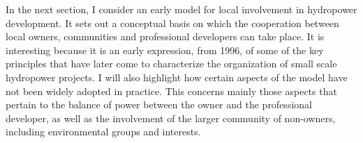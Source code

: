In the next section, I consider an early model for local involvement in hydropower development. It sets out a conceptual basis on which the cooperation between local owners, communities and professional developers can take place. It is interesting because it is an early expression, from 1996, of some of the key principles that have later come to characterize the organization of small scale hydropower projects. I will also highlight how certain aspects of the model have not been widely adopted in practice. This concerns mainly those aspects that pertain to the balance of power between the owner and the professional developer, as well as the involvement of the larger community of non-owners, including environmental groups and interests. 




